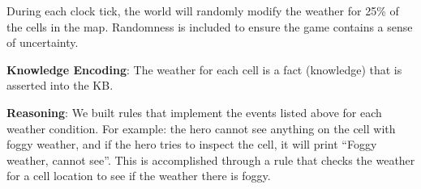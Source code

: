 \documentclass[9pt]{article}
\begin{document}
\begin{multicols*}{2}
During each clock tick, the world will randomly modify the weather for 25\% of the cells in the map. Randomness is included to ensure the game contains a sense of uncertainty.

\textbf{Knowledge Encoding}: The weather for each cell is a fact (knowledge) that is asserted into the KB.

\textbf{Reasoning}: We built rules that implement the events listed above for each weather condition. For example: the hero cannot see anything on the cell with foggy weather, and if the hero tries to inspect the cell, it will print “Foggy weather, cannot see”. This is accomplished through a rule that checks the weather for a cell location to see if the weather there is foggy.




\end{multicols*}
\end{document}
